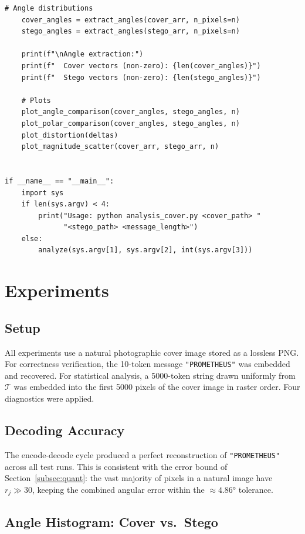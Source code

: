 \documentclass[12pt]{article}
\begin{document}
\begin{lstlisting}[caption={Comparative analysis of cover vs.\ stego image
(\texttt{analysis.py})}, label={lst:analysis}]
    # Angle distributions
    cover_angles = extract_angles(cover_arr, n_pixels=n)
    stego_angles = extract_angles(stego_arr, n_pixels=n)

    print(f"\nAngle extraction:")
    print(f"  Cover vectors (non-zero): {len(cover_angles)}")
    print(f"  Stego vectors (non-zero): {len(stego_angles)}")

    # Plots
    plot_angle_comparison(cover_angles, stego_angles, n)
    plot_polar_comparison(cover_angles, stego_angles, n)
    plot_distortion(deltas)
    plot_magnitude_scatter(cover_arr, stego_arr, n)


if __name__ == "__main__":
    import sys
    if len(sys.argv) < 4:
        print("Usage: python analysis_cover.py <cover_path> "
              "<stego_path> <message_length>")
    else:
        analyze(sys.argv[1], sys.argv[2], int(sys.argv[3]))\end{lstlisting}

\section{Experiments}
\label{sec:experiments}

\subsection{Setup}

All experiments use a natural photographic cover image stored as a lossless
PNG. For correctness verification, the 10-token message \texttt{"PROMETHEUS"}
was embedded and recovered. For statistical analysis, a 5000-token string
drawn uniformly from $\mathcal{T}$ was embedded into the first 5000 pixels
of the cover image in raster order. Four diagnostics were applied.

\subsection{Decoding Accuracy}

The encode-decode cycle produced a perfect reconstruction of
\texttt{"PROMETHEUS"} across all test runs. This is consistent with the
error bound of Section~\ref{subsec:quant}: the vast majority of pixels in a
natural image have $r_j \gg 30$, keeping the combined angular error within
the $\approx 4.86°$ tolerance.

\subsection{Angle Histogram: Cover vs.\ Stego}
\end{document}
